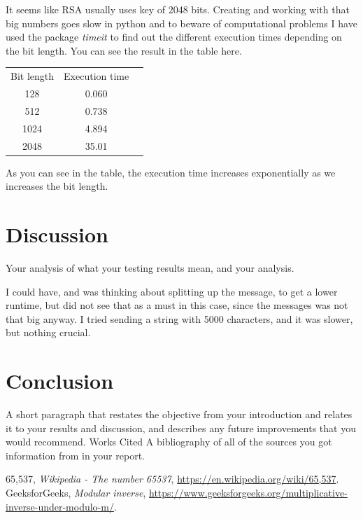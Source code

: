 \documentclass[12pt, letterpaper]{article}
\begin{document}
It seems like RSA usually uses key of 2048 bits. Creating and working with that big numbers goes slow in python and to beware of computational problems I have used the package \textit{timeit} to find out the different execution times depending on the bit length. You can see the result in the table here.

\begin{center}
\begin{tabular}{ |c|c|c| } 
 \hline
 Bit length & Execution time\\
 128 & 0.060 \\ 
 512 & 0.738 \\ 
 1024 & 4.894 \\ 
 2048 & 35.01 \\
 \hline
\end{tabular}
\end{center}

As you can see in the table, the execution time increases exponentially as we increases the bit length.

\section*{Discussion}
Your analysis of what your testing results mean, and your analysis.

I could have, and was thinking about splitting up the message, to get a lower runtime, but did not see that as a must in this case, since the messages was not that big anyway. I tried sending a string with 5000 characters, and it was slower, but nothing crucial.

\section*{Conclusion}
A short paragraph that restates the objective from your introduction and relates it to your results and discussion, and
describes any future improvements that you would recommend. Works Cited A bibliography of all of the sources
you got information from in your report. 


\begin{thebibliography}{10} 
 65,537,  \emph{Wikipedia - The number 65537},
\url{https://en.wikipedia.org/wiki/65,537}.
 GeeksforGeeks,  \emph{Modular inverse},
\url{https://www.geeksforgeeks.org/multiplicative-inverse-under-modulo-m/}.
\end{thebibliography}
\end{document}
